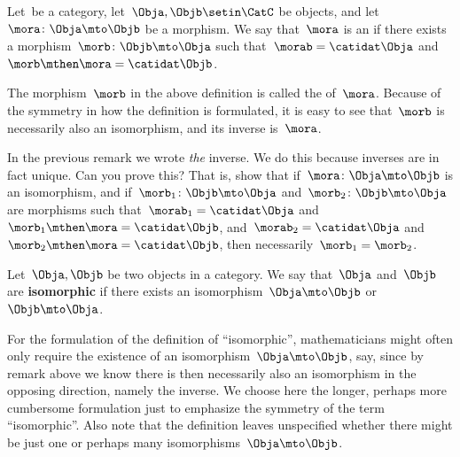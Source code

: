 \begin{ctdefinition}[Isomorphism]
    \label{def:isomorphism}
    Let~\CatC be a category, let~$\Obja,\Objb \setin \CatC$ be objects, and let~$\mora \colon \Obja \mto \Objb$ be a morphism.
    We say that~$\mora$ is an \emph{} if there exists a morphism~$\morb\colon \Objb \mto \Obja$ such that~$\morab = \catidat\Obja$ and~$\morb \mthen \mora = \catidat\Objb$.
\end{ctdefinition}

\begin{remark}
    \label{rem:inverse}
    The morphism~$\morb$ in the above definition is called the \textbf{} of~$\mora$.
    Because of the symmetry in how the definition is formulated, it is easy to see that~$\morb$ is necessarily also an isomorphism, and its inverse is~$\mora$.
\end{remark}

\begin{exercise}
    \label{ex:isoinverse}
    In the previous remark we wrote \emph{the} inverse.
    We do this because inverses are in fact unique.
    Can you prove this?
    That is, show that if~$\mora \colon \Obja \mto \Objb$ is an isomorphism, and if~$\morb_1\colon \Objb \mto \Obja$ and~$\morb_2\colon \Objb \mto \Obja$ are morphisms such that~$\morab_1 = \catidat\Obja$ and~$\morb_1 \mthen \mora = \catidat\Objb$, and~$\morab_2 = \catidat\Obja$ and~$\morb_2 \mthen \mora = \catidat\Objb$, then necessarily~$\morb_1 = \morb_2$.
\end{exercise}
\begin{solution}
    \missingsolution
\end{solution}

\begin{ctdefinition}
    Let~$\Obja,\Objb$ be two objects in a category.
    We say that~$\Obja$ and~$\Objb$ are \textbf{isomorphic} if there exists an isomorphism~$\Obja \mto \Objb$ or~$\Objb \mto \Obja$.
\end{ctdefinition}

For the formulation of the definition of ``isomorphic'', mathematicians might often only require the existence of an isomorphism~$\Obja \mto \Objb$, say, since by remark above we know there is then necessarily also an isomorphism in the opposing direction, namely the inverse.
We choose here the longer, perhaps more cumbersome formulation just to emphasize the symmetry of the term ``isomorphic''.
Also note that the definition leaves unspecified whether there might be just one or perhaps many isomorphisms~$\Obja \mto \Objb$.

